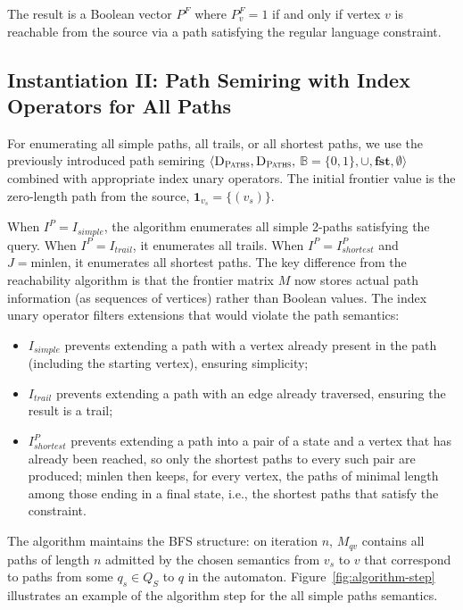The result is a Boolean vector $P^F$ where $P^F_v = 1$ if and only if vertex $v$ is reachable from the source via a path satisfying the regular language constraint.

\subsection{Instantiation II: Path Semiring with Index Operators for All Paths}

For enumerating all simple paths, all trails, or all shortest paths, we use the previously introduced path semiring $\langle \textsc{D}_{\textsc{Paths}}, \textsc{D}_{\textsc{Paths}},$ $\mathbb{B} = \{ 0, 1 \}, \cup, \textbf{fst}, \emptyset \rangle$ combined with appropriate index unary operators.
The initial frontier value is the zero-length path from the source, $\mathbf{1}_{v_s} = \{ (v_s) \}$.

When $I^P = I_{simple}$, the algorithm enumerates all simple 2-paths satisfying the query. When $I^P = I_{trail}$, it enumerates all trails. When $I^P = I^P_{shortest}$ and $J = \mathrm{minlen}$, it enumerates all shortest paths.
The key difference from the reachability algorithm is that the frontier matrix $M$ now stores actual path information (as sequences of vertices)
rather than Boolean values. The index unary operator filters extensions that would violate the path semantics:

\begin{itemize}
	\item $I_{simple}$ prevents extending a path with a vertex already present in the path (including the starting vertex), ensuring simplicity;
	\item $I_{trail}$ prevents extending a path with an edge already traversed, ensuring the result is a trail;
	\item $I^P_{shortest}$ prevents extending a path into a pair of a state and a vertex that has already been reached, so only the shortest paths to every such pair are produced; $\mathrm{minlen}$ then keeps, for every vertex, the paths of minimal length among those ending in a final state, i.e., the shortest paths that satisfy the constraint.
\end{itemize}

The algorithm maintains the BFS structure: on iteration $n$, $M_{qv}$ contains all paths of length $n$ admitted by the chosen semantics from $v_s$ to $v$ that correspond to paths from some $q_s \in Q_S$ to $q$ in the automaton.
Figure~\ref{fig:algorithm-step} illustrates an example of the algorithm step for the all simple paths semantics.

